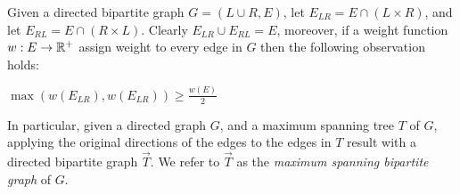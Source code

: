 \label{sub:bipartition}
Given a directed bipartite graph $G = (L\cup R, E)$, 
let $E_{LR} = E \cap (L \times R)$, 
and let $E_{RL} = E \cap (R \times L)$.
Clearly $E_{LR} \cup E_{RL} = E$, moreover, 
if a weight function $w:E \rightarrow \mathbb{R^+}$ 
assign weight to every edge in $G$ then the following observation holds:
\begin{observation}
\label{ob:bipartition}
$\max(w(E_{LR}), w(E_{LR})) \geq \frac{w(E)}{2}$
\end{observation}

In particular, given a directed graph $G$, 
and a maximum spanning tree $T$ of $G$, 
applying the original directions of the edges to the edges in $T$ result 
with a directed bipartite graph $\overrightarrow{T}$.
We refer to $\overrightarrow{T}$ as the \emph{maximum spanning bipartite graph}
of $G$.